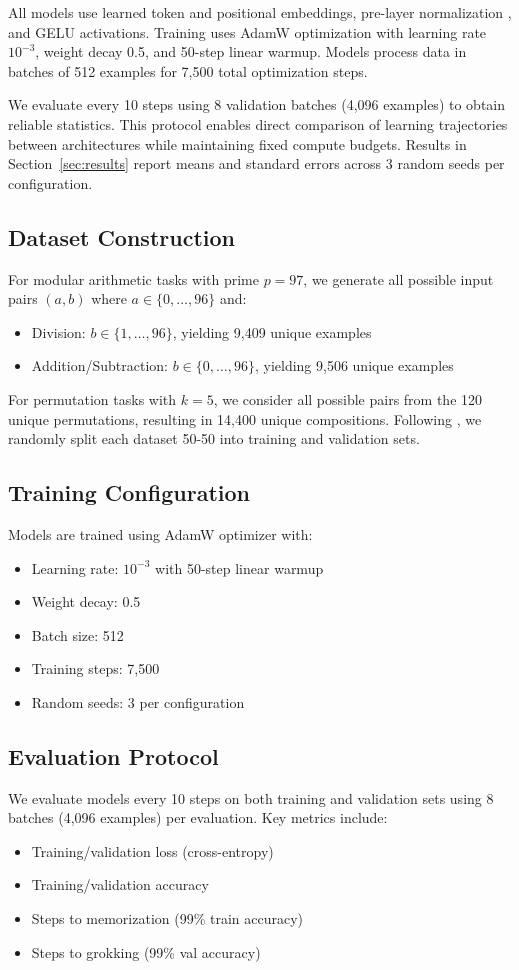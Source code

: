 \documentclass{article} %
\begin{document}
All models use learned token and positional embeddings, pre-layer normalization \citep{ba2016layer}, and GELU activations. Training uses AdamW optimization \citep{loshchilov2017adamw} with learning rate $10^{-3}$, weight decay 0.5, and 50-step linear warmup. Models process data in batches of 512 examples for 7,500 total optimization steps.

We evaluate every 10 steps using 8 validation batches (4,096 examples) to obtain reliable statistics. This protocol enables direct comparison of learning trajectories between architectures while maintaining fixed compute budgets. Results in Section~\ref{sec:results} report means and standard errors across 3 random seeds per configuration.

\subsection{Dataset Construction}
For modular arithmetic tasks with prime $p=97$, we generate all possible input pairs $(a,b)$ where $a \in \{0,\ldots,96\}$ and:
\begin{itemize}
    \item Division: $b \in \{1,\ldots,96\}$, yielding 9,409 unique examples
    \item Addition/Subtraction: $b \in \{0,\ldots,96\}$, yielding 9,506 unique examples
\end{itemize}
For permutation tasks with $k=5$, we consider all possible pairs from the 120 unique permutations, resulting in 14,400 unique compositions. Following \citet{power2022grokking}, we randomly split each dataset 50-50 into training and validation sets.

\subsection{Training Configuration}
Models are trained using AdamW optimizer \citep{loshchilov2017adamw} with:
\begin{itemize}
    \item Learning rate: $10^{-3}$ with 50-step linear warmup
    \item Weight decay: 0.5
    \item Batch size: 512
    \item Training steps: 7,500
    \item Random seeds: 3 per configuration
\end{itemize}

\subsection{Evaluation Protocol}
We evaluate models every 10 steps on both training and validation sets using 8 batches (4,096 examples) per evaluation. Key metrics include:
\begin{itemize}
    \item Training/validation loss (cross-entropy)
    \item Training/validation accuracy
    \item Steps to memorization (99\% train accuracy)
    \item Steps to grokking (99\% val accuracy)
\end{itemize}
\end{document}
